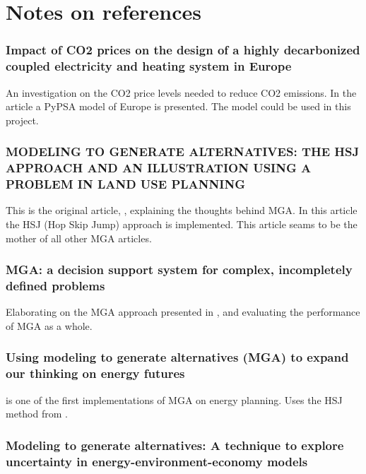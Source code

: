 

\section{Notes on references}

\subsubsection{Impact of CO2 prices on the design of a highly decarbonized coupled
electricity and heating system in Europe\cite{PypsaModel}}
An investigation on the CO2 price levels needed to reduce CO2 emissions. In the article a PyPSA model of Europe is presented. The model could be used in this project. 

\subsubsection{MODELING TO GENERATE ALTERNATIVES: THE HSJ
APPROACH AND AN ILLUSTRATION USING A
PROBLEM IN LAND USE PLANNING \cite{Brill_MGA_1982}}

This is the original article, \cite{Brill_MGA_1982}, explaining the thoughts behind MGA. In this article the HSJ (Hop Skip Jump) approach is implemented. This article seams to be the mother of all other MGA articles. 

\subsubsection{MGA: a decision support system for complex, incompletely defined problems\cite{Brill_MGA_1990}}
Elaborating on the MGA approach presented in \cite{Brill_MGA_1982}, and evaluating the performance of MGA as a whole. 

\subsubsection{Using modeling to generate alternatives (MGA) to expand our thinking on
energy futures\cite{DeCarolis_MGA}}

\cite{DeCarolis_MGA} is one of the first implementations of MGA on energy planning. Uses the HSJ method from \cite{Brill_MGA_1982}.

\subsubsection{Modeling to generate alternatives: A technique to explore uncertainty
in energy-environment-economy models \cite{MGA}}

